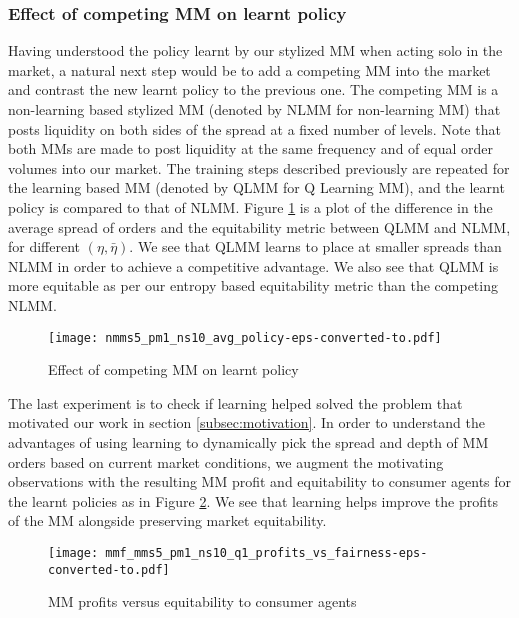 \documentclass[sigconf]{acmart}
\begin{document}
\subsubsection{Effect of competing MM on learnt policy}
Having understood the policy learnt by our stylized MM when acting solo in the market, a natural next step would be to add a competing MM into the market and contrast the new learnt policy to the previous one. The competing MM is a non-learning based stylized MM (denoted by NLMM for non-learning MM) that posts liquidity on both sides of the spread at a fixed number of levels. Note that both MMs are made to post liquidity at the same frequency and of equal order volumes into our market. The training steps described previously are repeated for the learning based MM (denoted by QLMM for Q Learning MM), and the learnt policy is compared to that of NLMM. Figure \ref{fig:qmm_d2} is a plot of the difference in the average spread of orders and the equitability metric between QLMM and NLMM, for different $(\eta,\bar\eta)$. We see that QLMM learns to place at smaller spreads than NLMM in order to achieve a competitive advantage. We also see that QLMM is more equitable as per our entropy based equitability metric than the competing NLMM. 
\begin{figure}
    \centering
    \texttt{[image: nmms5\_pm1\_ns10\_avg\_policy-eps-converted-to.pdf]}
    \caption{Effect of competing MM on learnt policy}
    \label{fig:qmm_d2}
\end{figure}

The last experiment is to check if learning helped solved the problem that motivated our work in section \ref{subsec:motivation}. In order to understand the advantages of using learning to dynamically pick the spread and depth of MM orders based on current market conditions, we augment the motivating observations with the resulting MM profit and equitability to consumer agents for the learnt policies as in Figure \ref{fig:mmf01}. We see that learning helps improve the profits of the MM alongside preserving market equitability. 

\begin{figure}
    \centering
    \texttt{[image: mmf\_mms5\_pm1\_ns10\_q1\_profits\_vs\_fairness-eps-converted-to.pdf]}
    \caption{MM profits versus equitability to consumer agents}
    \label{fig:mmf01}
\end{figure}
\end{document}
